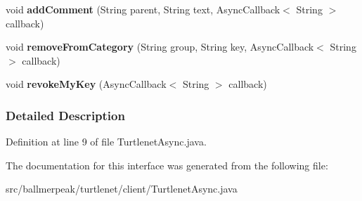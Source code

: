 \begin{DoxyCompactItemize}
\item 
\hypertarget{interfaceballmerpeak_1_1turtlenet_1_1client_1_1TurtlenetAsync_a83a5d15e18989bb17ac0bc36d4112dc9}{void {\bfseries add\-Comment} (String parent, String text, Async\-Callback$<$ String $>$ callback)}\label{interfaceballmerpeak_1_1turtlenet_1_1client_1_1TurtlenetAsync_a83a5d15e18989bb17ac0bc36d4112dc9}

\item 
\hypertarget{interfaceballmerpeak_1_1turtlenet_1_1client_1_1TurtlenetAsync_a9b2834a568cdf734a62200928a259eb2}{void {\bfseries remove\-From\-Category} (String group, String key, Async\-Callback$<$ String $>$ callback)}\label{interfaceballmerpeak_1_1turtlenet_1_1client_1_1TurtlenetAsync_a9b2834a568cdf734a62200928a259eb2}

\item 
\hypertarget{interfaceballmerpeak_1_1turtlenet_1_1client_1_1TurtlenetAsync_a03d97f6d5e9f45f538af9c45eb460b94}{void {\bfseries revoke\-My\-Key} (Async\-Callback$<$ String $>$ callback)}\label{interfaceballmerpeak_1_1turtlenet_1_1client_1_1TurtlenetAsync_a03d97f6d5e9f45f538af9c45eb460b94}

\end{DoxyCompactItemize}


\subsubsection{Detailed Description}


Definition at line 9 of file Turtlenet\-Async.\-java.



The documentation for this interface was generated from the following file\-:\begin{DoxyCompactItemize}
\item 
src/ballmerpeak/turtlenet/client/Turtlenet\-Async.\-java\end{DoxyCompactItemize}
